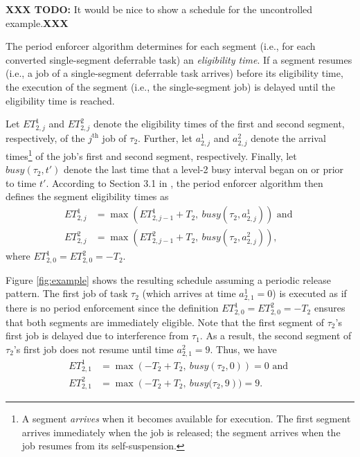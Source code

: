 \textbf{XXX TODO:} It would be nice to show a schedule for the uncontrolled example.\textbf{XXX}

The period enforcer algorithm determines for each segment (i.e., for each converted single-segment deferrable task) an \emph{eligibility time}. If a segment resumes (i.e., a job of a single-segment deferrable task arrives) before its eligibility time, the execution of the segment (i.e., the single-segment job) is delayed until the eligibility time is reached.

Let $ET_{2,j}^1$ and $ET_{2,j}^2$ denote the eligibility times of the first and second segment, respectively, of the $j^{\mathrm{th}}$ job of $\tau_2$. Further, let $a^1_{2,j}$ and $a^2_{2,j}$ denote the arrival times\footnote{A segment \emph{arrives} when it becomes available for execution. The first segment arrives immediately when the job is released; the segment arrives when the job resumes from its self-suspension.} of the job's first and second segment, respectively.  Finally, let $\mathit{busy}(\tau_2, t')$ denote the last time that a level-2 busy interval began on or prior to time $t'$. According to Section 3.1 in \cite{Raj:suspension1991}, the period enforcer algorithm then defines the segment eligibility times as
\begin{align*}
	ET_{2,j}^1 & = \max\left(ET_{2,j-1}^1 + T_2,\ \mathit{busy}(\tau_2, a^1_{2,j})\right)  \text{ and }
\\
	ET_{2,j}^2 & = \max\left(ET_{2,j-1}^2 + T_2,\ \mathit{busy}(\tau_2, a^2_{2,j}) \right),
\end{align*}
where $ET_{2,0}^1 = ET_{2,0}^2 = -T_2$. 

Figure \ref{fig:example} shows the resulting schedule assuming a periodic release pattern. The first job of task $\tau_2$ (which arrives at time $a^1_{2,1} =  0$) is executed as if there is no period enforcement since the definition $ET_{2,0}^1 = ET_{2,0}^2 = -T_2$ ensures that both segments are immediately eligible. Note that the first segment of $\tau_2$'s first job is delayed due to interference from $\tau_1$. As a result, the second segment of $\tau_2$'s first job does not resume until time $a^2_{2,1} = 9$. Thus, we have
\begin{align*}
	ET_{2,1}^1 & = \max\left(-T_2 + T_2,\ \mathit{busy}(\tau_2, 0)\right) = 0  \text{ and }
\\
	ET_{2,1}^2 & = \max\left(-T_2 + T_2,\ \mathit{busy}(\tau_2, 9\right) ) = 9.
\end{align*}

